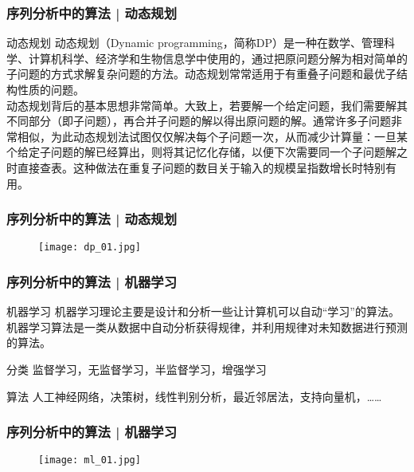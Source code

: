 \begin{frame}
  \frametitle{序列分析中的算法 | 动态规划}
  \begin{block}{动态规划}
    动态规划（Dynamic programming，简称DP）是一种在数学、管理科学、计算机科学、经济学和生物信息学中使用的，通过把原问题分解为相对简单的子问题的方式求解复杂问题的方法。动态规划常常适用于有重叠子问题和最优子结构性质的问题。\\
    \vspace{0.5em}
动态规划背后的基本思想非常简单。大致上，若要解一个给定问题，我们需要解其不同部分（即子问题），再合并子问题的解以得出原问题的解。通常许多子问题非常相似，为此动态规划法试图仅仅解决每个子问题一次，从而减少计算量：一旦某个给定子问题的解已经算出，则将其记忆化存储，以便下次需要同一个子问题解之时直接查表。这种做法在重复子问题的数目关于输入的规模呈指数增长时特别有用。
  \end{block}
\end{frame}

\begin{frame}
  \frametitle{序列分析中的算法 | 动态规划}
  \begin{figure}
    \centering
    \texttt{[image: dp\_01.jpg]}
  \end{figure}
\end{frame}

\begin{frame}
  \frametitle{序列分析中的算法 | 机器学习}
  \begin{block}{机器学习}
    机器学习理论主要是设计和分析一些让计算机可以自动“学习”的算法。机器学习算法是一类从数据中自动分析获得规律，并利用规律对未知数据进行预测的算法。
  \end{block}
  \pause
  \begin{block}{分类}
    监督学习，无监督学习，半监督学习，增强学习
  \end{block}
  \pause
  \begin{block}{算法}
    人工神经网络，决策树，线性判别分析，最近邻居法，支持向量机，……
  \end{block}
\end{frame}

\begin{frame}
  \frametitle{序列分析中的算法 | 机器学习}
  \begin{figure}
    \centering
    \texttt{[image: ml\_01.jpg]}
  \end{figure}
\end{frame}

